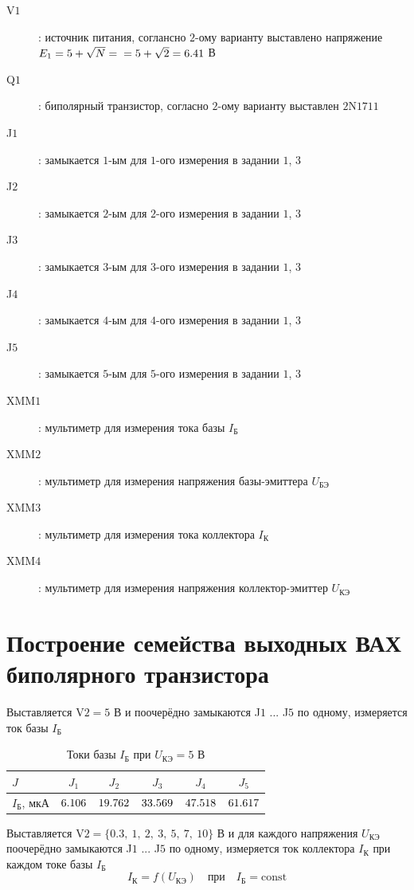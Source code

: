 \documentclass[12pt,a4paper]{article}
\newcommand{\CalcTwo}  [1]{\fpeval{round((#1),2)}}
\def\VariantN{2}          					 %
\def\BJTName{$2$N$1711$}
\def\IbOne  {\fpeval{6.106 * 10^{-6}}} %
\def\IbTwo  {\fpeval{19.762 * 10^{-6}}} %
\def\IbThree{\fpeval{33.569 * 10^{-6}}} %
\def\IbFour {\fpeval{47.518 * 10^{-6}}} %
\def\IbFive {\fpeval{61.617 * 10^{-6}}} %
\edef\Eone{\CalcTwo{5 + sqrt(\VariantN)}}   %
\begin{document}
\begin{description}
	\item[V$1$]: источник питания, соглансно $\VariantN$-ому варианту выставлено напряжение $E_1 = 5 + \sqrt{N} = \\ = 5 + \sqrt{\VariantN} = \Eone$ В
	\item[Q$1$]: биполярный транзистор, согласно $\VariantN$-ому варианту выставлен \BJTName
	\item[J$1$]: замыкается $1$-ым для $1$-ого измерения в задании $1$, $3$
	\item[J$2$]: замыкается $2$-ым для $2$-ого измерения в задании $1$, $3$
	\item[J$3$]: замыкается $3$-ым для $3$-ого измерения в задании $1$, $3$
	\item[J$4$]: замыкается $4$-ым для $4$-ого измерения в задании $1$, $3$
	\item[J$5$]: замыкается $5$-ым для $5$-ого измерения в задании $1$, $3$
	\item[XMM$1$]: мультиметр для измерения тока базы $I_\text{Б}$
	\item[XMM$2$]: мультиметр для измерения напряжения базы-эмиттера $U_\text{БЭ}$
	\item[XMM$3$]: мультиметр для измерения тока коллектора $I_\text{К}$
	\item[XMM$4$]: мультиметр для измерения напряжения коллектор-эмиттер $U_\text{КЭ}$
\end{description}

\section{Построение семейства выходных ВАХ биполярного транзистора}
Выставляется  V$2 = 5$ В и поочерёдно замыкаются J$1$ ... J$5$ по одному, измеряется ток базы $I_\text{Б}$
\begin{table}[H]
\centering
\small
\begin{tabularx}{\textwidth}{|p{3cm}|C|C|C|C|C|}
	\hline
	$J$ & $J_1$ & $J_2$ & $J_3$ & $J_4$ & $J_5$ \\
	\hline
	$I_\text{Б}$, мкА & $\fpeval{\IbOne * 10^{6}}$ & $\fpeval{\IbTwo * 10^{6}}$ & $\fpeval{\IbThree * 10^{6}}$ & $\fpeval{\IbFour * 10^{6}}$ & $\fpeval{\IbFive * 10^{6}}$ \\
	\hline
\end{tabularx}
\caption{Токи базы $I_\text{Б}$ при $U_\text{КЭ}=5$ В}
\end{table}

Выставляется V$2 = \{0.3,\ 1,\ 2,\ 3,\ 5,\ 7,\ 10\}$ В и для каждого напряжения $U_\text{КЭ}$ поочерёдно 
замыкаются J$1$ ... J$5$ по одному, измеряется ток коллектора $I_\text{К}$ при каждом токе базы $I_\text{Б}$
\begin{equation*}
I_\text{К} = f(U_\text{КЭ}) \quad \text{при} \quad I_\text{Б} = \text{const}
\end{equation*}
\end{document}
